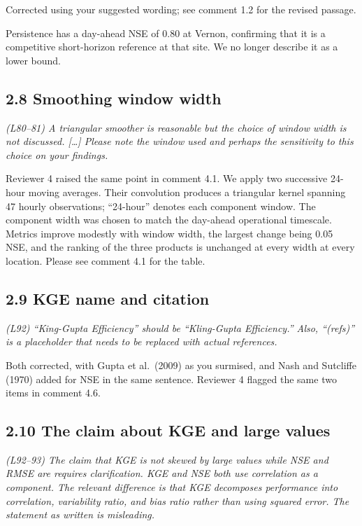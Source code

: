 \documentclass[11pt]{article}
\newenvironment{rc}%
  {\begin{list}{}{\setlength{\leftmargin}{1.5em}\setlength{\rightmargin}{1.5em}%
   \setlength{\topsep}{0.2em}\setlength{\parsep}{0pt}\setlength{\itemsep}{0pt}}%
   \item[]\itshape\color{quotegray}}%
  {\end{list}}
\begin{document}
Corrected using your suggested wording; see comment 1.2 for the revised passage.

Persistence has a day-ahead NSE of 0.80 at Vernon, confirming that it is a competitive
short-horizon reference at that site. We no longer describe it as a lower bound.

\subsection*{2.8 Smoothing window width}

\begin{rc}
(L80--81) A triangular smoother is reasonable but the choice of window width is not
discussed. [\ldots] Please note the window used and perhaps the sensitivity to this
choice on your findings.
\end{rc}

Reviewer 4 raised the same point in comment 4.1. We apply two successive 24-hour moving
averages. Their convolution produces a triangular kernel spanning 47 hourly observations;
``24-hour'' denotes each component window. The component width was chosen to match the
day-ahead operational timescale. Metrics improve
modestly with window width, the largest change being 0.05 NSE, and the ranking of the three
products is unchanged at every width at every location. Please see comment 4.1 for the table.

\subsection*{2.9 KGE name and citation}

\begin{rc}
(L92) ``King-Gupta Efficiency'' should be ``Kling-Gupta Efficiency.'' Also, ``(refs)''
is a placeholder that needs to be replaced with actual references.
\end{rc}

Both corrected, with Gupta et al.\ (2009) as you surmised, and Nash and Sutcliffe (1970)
added for NSE in the same sentence. Reviewer 4 flagged the same two items in comment 4.6.

\subsection*{2.10 The claim about KGE and large values}

\begin{rc}
(L92--93) The claim that KGE is not skewed by large values while NSE and RMSE are
requires clarification. KGE and NSE both use correlation as a component. The relevant
difference is that KGE decomposes performance into correlation, variability ratio, and
bias ratio rather than using squared error. The statement as written is misleading.
\end{rc}
\end{document}
